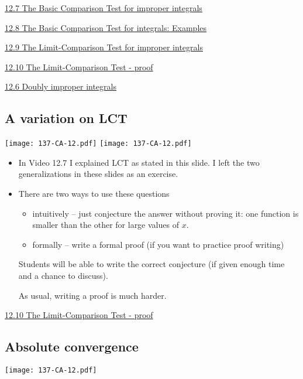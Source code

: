 \documentclass[11pt]{article}
\newcommand{\nl}{\hfill \vspace{-1.1\baselineskip}} %
\newcommand{\vvi}{\hspace{8mm} \href{https://www.youtube.com/watch?v=WAhjLIfNnjI&list=PLlwePzQY_wW-OVbBuwbFDl8RB5kt2Tngo&index=6}{12.6 Doubly improper integrals}}
\newcommand{\vvii}{\hspace{8mm} \href{https://www.youtube.com/watch?v=8xtCdrLzQpQ&list=PLlwePzQY_wW-OVbBuwbFDl8RB5kt2Tngo&index=7}{12.7 The Basic Comparison Test for improper integrals}}
\newcommand{\vviii}{\hspace{8mm} \href{https://www.youtube.com/watch?v=9NeR7QXGJbE&list=PLlwePzQY_wW-OVbBuwbFDl8RB5kt2Tngo&index=8}{12.8 The Basic Comparison Test for integrals: Examples}}
\newcommand{\vix}{\hspace{8mm} \href{https://www.youtube.com/watch?v=2hOr_4hc3pA&list=PLlwePzQY_wW-OVbBuwbFDl8RB5kt2Tngo&index=9}{12.9 The Limit-Comparison Test for improper integrals}}
\newcommand{\vx}{\hspace{8mm} \href{https://www.youtube.com/watch?v=FqJSWNtT_aA&list=PLlwePzQY_wW-OVbBuwbFDl8RB5kt2Tngo&index=10}{12.10 The Limit-Comparison Test - proof}}
\begin{document}
\begin{videos}
\vvii

\vviii

\vix

\vx

\vvi
\end{videos}

\newpage
\subsection{A variation on LCT}

\begin{center}
{ \texttt{[image: 137-CA-12.pdf]}} \quad
{ \texttt{[image: 137-CA-12.pdf]}} 
\end{center}

\begin{comments}
\nl
	\begin{itemize}
		\item In Video 12.7 I explained LCT as stated in this slide.  I left the two generalizations in these slides as an exercise.
		\item There are two ways to use these questions
			\begin{itemize}
				\item  intuitively -- just conjecture the answer without proving it: one function is smaller than the other for large values of $x$.
				\item  formally -- write a formal proof (if you want to practice proof writing)
			\end{itemize}
			Students will be able to write the correct conjecture (if given enough time and a chance to discuss). 
			
			As usual, writing a proof is much harder.
	\end{itemize}
\end{comments}

\begin{videos}
\vx
\end{videos}

\newpage
\subsection{Absolute convergence}

\begin{center}
{ \texttt{[image: 137-CA-12.pdf]}} 
\end{center}
\end{document}
